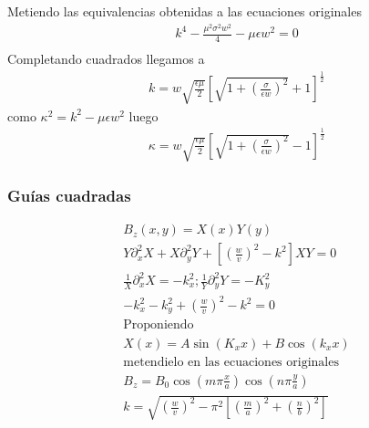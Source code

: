 Metiendo las equivalencias obtenidas a las ecuaciones originales 
\begin{subequations}
	\begin{eqnarray}
	k^4 - \frac{\mu^2 \sigma^2 w^2}{4} - \mu \epsilon w^2=0 \nonumber\\
	\end{eqnarray}
\end{subequations}
Completando cuadrados llegamos a 
\begin{subequations}
	\begin{eqnarray}
	k= w \sqrt{\frac{\epsilon \mu}{2}} \left[\sqrt{1+\left(\frac{\sigma}{\epsilon w} \right)^2}+1 \right]^\frac{1}{2}
	\end{eqnarray}
\end{subequations}
como $\kappa^2 = k^2 - \mu \epsilon w^2$ luego
\begin{subequations}
	\begin{eqnarray}
	\kappa = w \sqrt{\frac{\epsilon \mu}{2}} \left[\sqrt{1 + \left(\frac{\sigma}{\epsilon w} \right)^2}-1\right]^\frac{1}{2}
	\end{eqnarray}
\end{subequations}
\subsubsection{Guías cuadradas}
\begin{subequations}
	\begin{align}
	B_{z}(x,y)=X(x)Y(y) \nonumber \\
	Y \partial_{x}^2 X+X \partial_{y}^2Y + [(\frac{w}{v})^2-k^2]XY=0 \nonumber \\
	\frac{1}{X} \partial_{x}^2 X=-k_{x}^2 ; \frac{1}{Y}\partial_{y}^2 Y = -K_{y}^2 \nonumber \\
	-k_{x}^2 - k_{y}^2+(\frac{w}{v})^2 - k^2 = 0 \nonumber\\
	\text{Proponiendo } \nonumber \\
	X(x)=A \sin (K_{x} x) + B \cos(k_{x}x)  \\
	\text{metendielo en las ecuaciones originales} \nonumber \\
	B_{z}=B_{0} \cos(m \pi \frac{x}{a}) \cos(n \pi \frac{y}{a}) \\
	k = \sqrt{(\frac{w}{v})^2-\pi^2 [(\frac{m}{a})^2+(\frac{n}{b})^2]} 
	\end{align}
\end{subequations}
